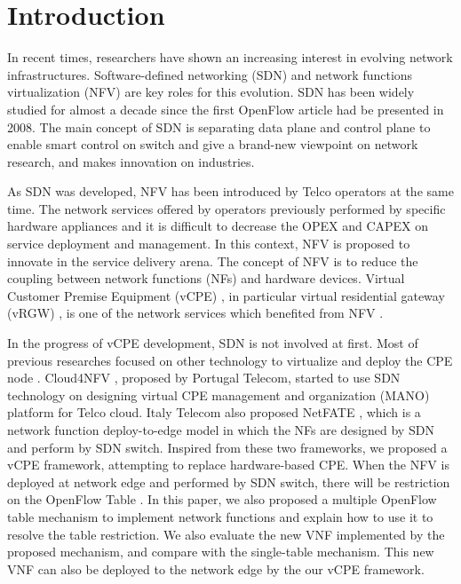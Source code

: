 \documentclass[conference]{IEEEtran}
\begin{document}
\section{Introduction}
In recent times, researchers have shown an increasing interest in evolving network infrastructures.
Software-defined networking (SDN) and network functions virtualization (NFV) are key roles for this evolution.
SDN \cite{sdn-mckeown-2009-talk, sdn-newnorm, sdn-road, sdn-compre-survey} has been widely studied for almost a decade since the first OpenFlow \cite{openflow-mckeown-2008, openflow-spec} article had be presented in 2008.
The main concept of SDN is separating data plane and control plane to enable smart control on switch and give a brand-new viewpoint on network research, and makes innovation on industries.

As SDN was developed, NFV \cite{nfv-wp, etsi-nfv-archi, nfv-survey} has been introduced by Telco operators at the same time.
The network services offered by operators previously performed by specific hardware appliances and it is difficult to decrease the OPEX and CAPEX on service deployment and management.
In this context, NFV is proposed to innovate in the service delivery arena.
The concept of NFV is to reduce the coupling between network functions (NFs) and hardware devices.
Virtual Customer Premise Equipment (vCPE) \cite{nec-vcpe, vcpe-enhance}, in particular virtual residential gateway (vRGW) \cite{nfv-home}, is one of the network services which benefited from NFV \cite{etsi-nfv-usecase}.

In the progress of vCPE development, SDN is not involved at first.
Most of previous researches focused on other technology to virtualize and deploy the CPE node \cite{virtual-rg, security-vgw, design-vrgw, nfv-hgw-surrogate, linux-cpe, nfv-resoure-contrain-cpe}.
Cloud4NFV \cite{cloud4nfv, cloud4nfv-telco}, proposed by Portugal Telecom, started to use SDN technology on designing virtual CPE management and organization (MANO) platform for Telco cloud.
Italy Telecom also proposed NetFATE \cite{netfate}, which is a network function deploy-to-edge model in which the NFs are designed by SDN and perform by SDN switch. Inspired from these two frameworks, we proposed a vCPE framework, attempting to replace hardware-based CPE.
When the NFV is deployed at network edge and performed by SDN switch, there will be restriction on the OpenFlow Table \cite{multiple-flow-table}.
In this paper, we also proposed a multiple OpenFlow table mechanism to implement network functions and explain how to use it to resolve the table restriction.
We also evaluate the new VNF implemented by the proposed mechanism, and compare with the single-table mechanism.
This new VNF can also be deployed to the network edge by the our vCPE framework.
\end{document}
